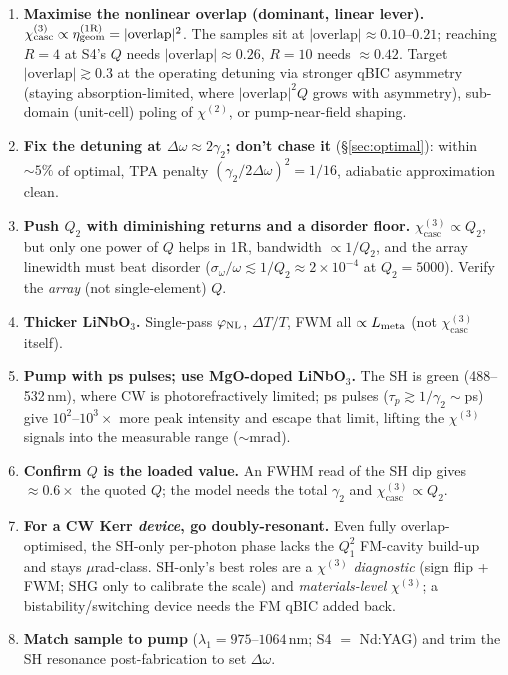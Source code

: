 \documentclass[11pt,a4paper]{article}
\newcommand{\chitwo}{\chi^{(2)}}
\newcommand{\chithree}{\chi^{(3)}}
\newcommand{\Dom}{\Delta\omega}
\newcommand{\geom}{{\rm geom}}
\newcommand{\chicasc}{\chithree_{\text{casc}}}
\newcommand{\etag}{\eta_{\geom}^{(1\mathrm R)}}
\begin{document}
\begin{enumerate}[label=\textbf{R\arabic*.},leftmargin=2.6em]
  \item \textbf{Maximise the nonlinear overlap (dominant, linear lever).}
        $\chicasc\propto\etag=|\text{overlap}|^2$. The samples sit at
        $|\text{overlap}|\!\approx\!0.10$--$0.21$; reaching $R=4$ at S4's $Q$ needs
        $|\text{overlap}|\!\approx\!0.26$, $R=10$ needs $\approx\!0.42$. Target
        $|\text{overlap}|\!\gtrsim\!0.3$ at the operating detuning via stronger
        qBIC asymmetry (staying absorption-limited, where $|\text{overlap}|^2Q$
        grows with asymmetry), sub-domain (unit-cell) poling of $\chitwo$, or
        pump-near-field shaping.
  \item \textbf{Fix the detuning at $\Dom\approx2\gamma_2$; don't chase it}
        (\S\ref{sec:optimal}): within $\sim\!5\%$ of optimal, TPA penalty
        $(\gamma_2/2\Dom)^2=1/16$, adiabatic approximation clean.
  \item \textbf{Push $Q_2$ with diminishing returns and a disorder floor.}
        $\chicasc\propto Q_2$, but only one power of $Q$ helps in 1R, bandwidth
        $\propto1/Q_2$, and the array linewidth must beat disorder
        ($\sigma_\omega/\omega\lesssim1/Q_2\!\approx\!2\times10^{-4}$ at
        $Q_2=5000$). Verify the \emph{array} (not single-element) $Q$.
  \item \textbf{Thicker LiNbO$_3$.} Single-pass $\varphi_{\rm NL}$, $\Delta T/T$,
        FWM all $\propto L_{\rm meta}$ (not $\chicasc$ itself).
  \item \textbf{Pump with ps pulses; use MgO-doped LiNbO$_3$.} The SH is green
        (488--532\,nm), where CW is photorefractively limited; ps pulses
        ($\tau_p\!\gtrsim\!1/\gamma_2\!\sim\!$ps) give $10^2$--$10^3\times$ more peak
        intensity and escape that limit, lifting the $\chithree$ signals into the
        measurable range ($\sim$mrad).
  \item \textbf{Confirm $Q$ is the loaded value.} An FWHM read of the SH dip gives
        $\approx\!0.6\times$ the quoted $Q$; the model needs the total $\gamma_2$
        and $\chicasc\propto Q_2$.
  \item \textbf{For a CW Kerr \emph{device}, go doubly-resonant.} Even fully
        overlap-optimised, the SH-only per-photon phase lacks the $Q_1^2$ FM-cavity
        build-up and stays $\mu$rad-class. SH-only's best roles are a $\chithree$
        \emph{diagnostic} (sign flip + FWM; SHG only to calibrate the scale) and
        \emph{materials-level} $\chithree$; a bistability/switching device needs the
        FM qBIC added back.
  \item \textbf{Match sample to pump} ($\lambda_1=975$--$1064\,$nm; S4 $=$ Nd:YAG)
        and trim the SH resonance post-fabrication to set $\Dom$.
\end{enumerate}
\end{document}
